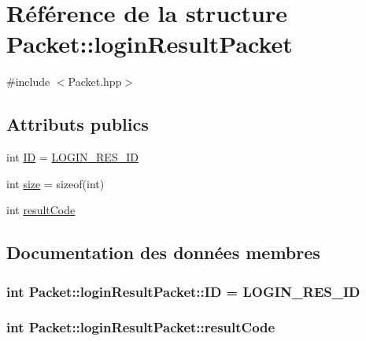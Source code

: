 \hypertarget{structPacket_1_1loginResultPacket}{}\section{Référence de la structure Packet\+:\+:login\+Result\+Packet}
\label{structPacket_1_1loginResultPacket}


{\ttfamily \#include $<$Packet.\+hpp$>$}

\subsection*{Attributs publics}
\begin{DoxyCompactItemize}
\item 
int \hyperlink{structPacket_1_1loginResultPacket_a9fd277c829ba18e929a71a1c0f5fbc60}{I\+D} = \hyperlink{classPacket_ae91c1d355e4c8f0bef5f893747473661adfad7675a2d1418c82df295276cbe695}{L\+O\+G\+I\+N\+\_\+\+R\+E\+S\+\_\+\+I\+D}
\item 
int \hyperlink{structPacket_1_1loginResultPacket_a270afae616b7a7399c2d4c483fcffec6}{size} = sizeof(int)
\item 
int \hyperlink{structPacket_1_1loginResultPacket_a148ad144908a219d1b6adde5c3337a2f}{result\+Code}
\end{DoxyCompactItemize}


\subsection{Documentation des données membres}
\hypertarget{structPacket_1_1loginResultPacket_a9fd277c829ba18e929a71a1c0f5fbc60}{}
\subsubsection[{I\+D}]{\setlength{\rightskip}{0pt plus 5cm}int Packet\+::login\+Result\+Packet\+::\+I\+D = {\bf L\+O\+G\+I\+N\+\_\+\+R\+E\+S\+\_\+\+I\+D}}\label{structPacket_1_1loginResultPacket_a9fd277c829ba18e929a71a1c0f5fbc60}
\hypertarget{structPacket_1_1loginResultPacket_a148ad144908a219d1b6adde5c3337a2f}{}
\subsubsection[{result\+Code}]{\setlength{\rightskip}{0pt plus 5cm}int Packet\+::login\+Result\+Packet\+::result\+Code}\label{structPacket_1_1loginResultPacket_a148ad144908a219d1b6adde5c3337a2f}
\hypertarget{structPacket_1_1loginResultPacket_a270afae616b7a7399c2d4c483fcffec6}{}
